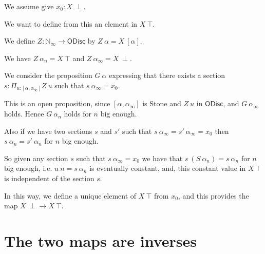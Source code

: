 \documentclass[10pt,a4paper]{article}
\newcommand{\nats}{\mathbb{N}}
\newcommand{\ODisc}{\mathsf{ODisc}}
\newcommand{\Noo}{\nats_{\infty}}
\begin{document}
\medskip

We assume give $x_0 : X~\perp$.

We want to define from this an element in $X~\top$.

\medskip


We define $Z:\Noo\rightarrow \ODisc$ by $Z~\alpha = X~[\alpha]$.

We have $Z~\alpha_n = X~\top$ and $Z~\alpha_{\infty} = X~\perp$.

We consider the proposition $G~\alpha$ expressing that there exists
a section $s:\Pi_{u:[\alpha,\alpha_{\infty}]}Z~u$ such that $s~\alpha_{\infty} = x_0$.

This is an open proposition, since $[\alpha,\alpha_{\infty}]$ is Stone and $Z~u$ in $\ODisc$,
and $G~\alpha_{\infty}$ holds. Hence $G~\alpha_n$ holds
for $n$ big enough.

Also if we have two sections $s$ and $s'$ such that  $s~\alpha_{\infty} =  s'~\alpha_{\infty} = x_0$
then $s~\alpha_n = s'~\alpha_n$ for $n$ big enough.

So given any section $s$ such that $s~\alpha_{\infty} = x_0$ we have that $s~(S~\alpha_n) = s~\alpha_n$
for $n$ big enough, i.e. $u~n = s~\alpha_n$ is eventually constant, and, this constant value in $X~\top$
is independent of the section $s$.

In this way, we define a unique element of $X~\top$ from $x_0$, and this provides the map $X~\perp\rightarrow X~\top$.

\section{The two maps are inverses}
\end{document}
